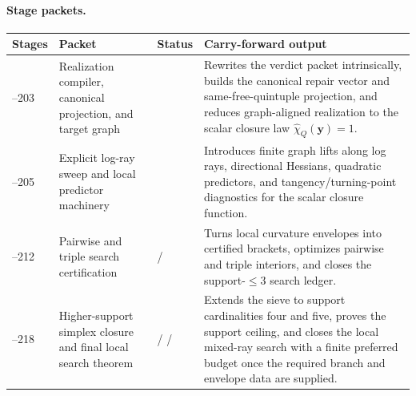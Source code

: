 \paragraph{Stage packets.}
\begin{center}
\small
\begin{tabular}{@{}>{\raggedright\arraybackslash}p{}>{\raggedright\arraybackslash}p{}>{\raggedright\arraybackslash}p{}>{\raggedright\arraybackslash}p{}@{}}
\toprule
Stages & Packet & Status & Carry-forward output \\
\midrule
201--203 & Realization compiler, canonical projection, and target graph & \StatusExactClosure{} & Rewrites the verdict packet intrinsically, builds the canonical repair vector and same-free-quintuple projection, and reduces graph-aligned realization to the scalar closure law \(\widehat\chi_Q(\mathbf y)=1\). \\
\addlinespace
204--205 & Explicit log-ray sweep and local predictor machinery & \StatusExactClosure{} & Introduces finite graph lifts along log rays, directional Hessians, quadratic predictors, and tangency/turning-point diagnostics for the scalar closure function. \\
\addlinespace
206--212 & Pairwise and triple search certification & \StatusExactClosure{} / \StatusNumerical{} & Turns local curvature envelopes into certified brackets, optimizes pairwise and triple interiors, and closes the support-\(\le3\) search ledger. \\
\addlinespace
213--218 & Higher-support simplex closure and final local search theorem & \StatusExactClosure{} / \StatusNumerical{} / \StatusOpen{} & Extends the sieve to support cardinalities four and five, proves the support ceiling, and closes the local mixed-ray search with a finite preferred budget once the required branch and envelope data are supplied. \\
\bottomrule
\end{tabular}
\end{center}


